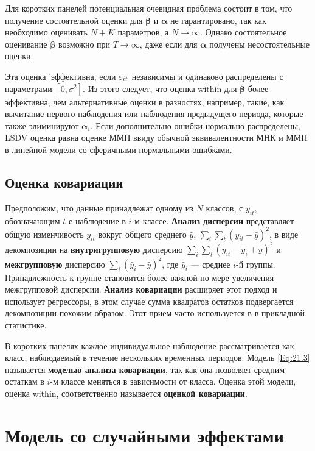 Для коротких панелей потенциальная очевидная проблема состоит в том, что получение состоятельной оценки для $\bm\beta$ и $\bm\alpha$ не гарантировано, так как необходимо оценивать $N+K$ параметров, а $N \rightarrow \infty$. Однако состоятельное оценивание $\bm\beta$  возможно при $T \rightarrow \infty$, даже если для $\bm\alpha$ получены несостоятельные оценки.

Эта оценка 'эффективна, если $\varepsilon_{it}$ независимы и одинаково распределены с параметрами $[0, \sigma^2]$. Из этого следует, что оценка within для $\bm\beta$ более эффективна, чем альтернативные оценки в разностях, например, такие, как вычитание первого наблюдения или наблюдения предыдущего периода, которые также элиминируют $\bm\alpha_i$. Если дополнительно ошибки нормально распределены, LSDV оценка равна оценке ММП ввиду обычной эквивалентности МНК и ММП в линейной модели со сферичными нормальными ошибками.

\subsection{Оценка ковариации}

Предположим, что данные принадлежат одному из $N$ классов, с $y_{it}$, обозначающим $t$-е наблюдение в $i$-м классе. \textbf{Анализ дисперсии} представляет общую изменчивость $y_{it}$ вокруг общего среднего $\bar{y}$, $\sum_i \sum_t (y_{it}-\bar{y})^2$, в виде декомпозиции на \textbf{внутригрупповую} дисперсию $\sum_i \sum_t (y_{it}-\bar{y}_i+\bar{y})^2$ и \textbf{межгрупповую} дисперсию $\sum_i(\bar{y}_i-\bar{y})^2$, где $\bar{y}_i$ --- среднее $i$-й группы. Принадлежность к группе становится более важной по мере увеличения межгрупповой дисперсии. \textbf{Анализ ковариации} расширяет этот подход и использует регрессоры, в этом случае сумма квадратов остатков подвергается декомпозиции похожим образом. Этот прием часто используется в в прикладной статистике.

В коротких панелях каждое индивидуальное наблюдение рассматривается как класс, наблюдаемый в течение нескольких временных периодов. Модель \ref{Eq:21.3} называется \textbf{моделью анализа ковариации}, так как она позволяет средним остаткам в $i$-м классе меняться в зависимости от класса. Оценка этой модели, оценка within, соответственно называется \textbf{оценкой ковариации}.

\section{Модель со случайными эффектами}

